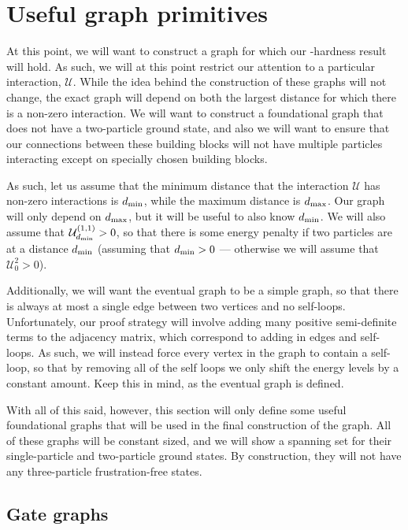 \documentclass[../thesis-main/thesis-main]{subfiles}
\begin{document}
\section{Useful graph primitives}\label{sec:graph_primitives}

At this point, we will want to construct a graph for which our \QMA-hardness result will hold.  As such, we will at this point restrict our attention to a particular interaction, $\mathcal{U}$.  While the idea behind the construction of these graphs will not change, the exact graph will depend on both the largest distance for which there is a non-zero interaction.  We will want to construct a foundational graph that does not have a two-particle ground state, and also we will want to ensure that our connections between these building blocks will not have multiple particles interacting except on specially chosen building blocks.

As such, let us assume that the minimum distance that the interaction $\mathcal{U}$ has non-zero interactions is $d_{\text{min}}$, while the maximum distance is $d_{\text{max}}$.  Our graph will only depend on $d_{\text{max}}$, but it will be useful to also know $d_{\text{min}}$.  We will also assume that $\mathcal{U}_{d_{\text{min}}}^{(1,1)} > 0$, so that there is some energy penalty if two particles are at a distance $d_{\text{min}}$ (assuming that $d_{\text{min}} > 0$ --- otherwise we will assume that $\mathcal{U}_0^{2} > 0$).

Additionally, we will want the eventual graph to be a simple graph, so that there is always at most a single edge between two vertices and no self-loops.  Unfortunately, our proof strategy will involve adding many positive semi-definite terms to the adjacency matrix, which correspond to adding in edges and self-loops.  As such, we will instead force every vertex in the graph to contain a self-loop, so that by removing all of the self loops we only shift the energy levels by a constant amount.  Keep this in mind, as the eventual graph is defined.

With all of this said, however, this section will only define some useful foundational graphs that will be used in the final construction of the graph.  All of these graphs will be constant sized, and we will show a spanning set for their single-particle and two-particle ground states.  By construction, they will not have any three-particle frustration-free states.

\subsection{Gate graphs}\label{sec:gate_graphs}
\end{document}
